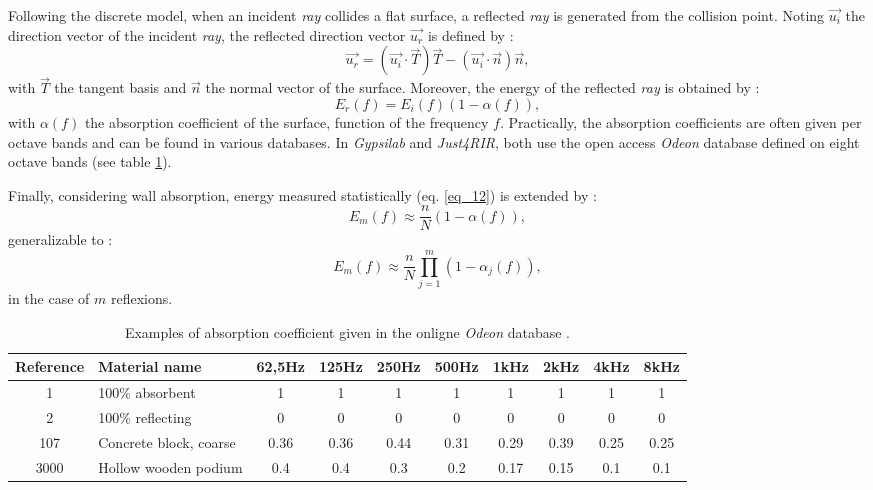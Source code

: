 \documentclass[AMA,STIX1COL]{WileyNJD-v2}
\begin{document}
Following the discrete model, when an incident \textit{ray} collides a flat surface, a reflected \textit{ray} is generated from the collision point. Noting $\overrightarrow{u_i}$ the direction vector of the incident  \textit{ray}, the reflected direction vector $\overrightarrow{u_r}$ is defined by :
\begin{equation}
\label{eq_15}
\overrightarrow{u_r} = (\overrightarrow{u_i} \cdot \overrightarrow{T})\overrightarrow{T} - (\overrightarrow{u_i} \cdot \overrightarrow{n})\overrightarrow{n},
\end{equation}
with $\overrightarrow{T}$ the tangent basis and $\overrightarrow{n}$ the normal vector of the surface. Moreover, the energy of the reflected \textit{ray} is obtained by :
\begin{equation}
E_r(f) = E_i(f)(1 - \alpha(f)),
\end{equation}
with $\alpha(f)$  the absorption coefficient of the surface, function of the frequency $f$. Practically, the absorption coefficients are often given per octave bands and can be found in various databases. In \textit{Gypsilab} and \textit{Just4RIR}, both use the open access \textit{Odeon} database \cite{odeon} defined on eight octave bands (see table \ref{tab_coeff_abs}). 

Finally, considering wall absorption, energy measured statistically (eq. \ref{eq_12}) is extended by :
\begin{equation}
E_m(f) \approx  \frac{n}{N}(1 - \alpha(f)),
\end{equation}
generalizable to :
\begin{equation}
E_m(f) \approx  \frac{n}{N}\prod_{j=1}^{m}(1 - \alpha_j(f)),
\label{eq_18}
\end{equation}
in the case of $m$ reflexions.

\begin{table}[t]
\centering
	\begin{tabular}{| c | m{2.5cm} | *{8}{c|}}
		\hline
		Reference & Material name & 62,5Hz & 125Hz & 250Hz & 500Hz & 1kHz & 2kHz & 4kHz & 8kHz \\
		  \hline
		  \hline
		   1 & 100\% absorbent & 1 & 1 & 1 & 1 & 1 & 1 & 1 & 1 \\
		   \hline
		2 & 100\% reflecting & 0 & 0 & 0 & 0 & 0 & 0 & 0 & 0 \\
		   \hline
		107 & Concrete block, coarse\footnotemark & 0.36 & 0.36 & 0.44 & 0.31 & 0.29 & 0.39 & 0.25 & 0.25 \\
		   \hline
		3000 & Hollow wooden podium\footnotemark & 0.4 & 0.4 & 0.3 & 0.2 & 0.17 & 0.15 & 0.1 & 0.1 \\
	     \hline
	 \end{tabular}
	\caption{Examples of absorption coefficient given in the onligne \textit{Odeon} database \cite{odeon}.}
	 \label{tab_coeff_abs}
\end{table}
\addtocounter{footnote}{-1}
\addtocounter{footnote}{1}
\end{document}
